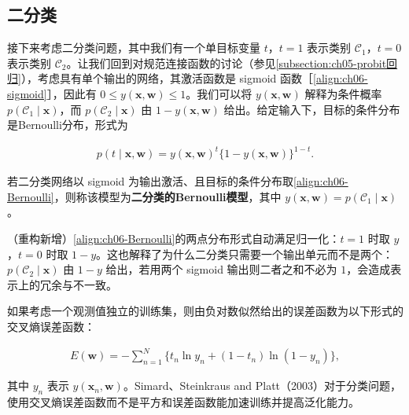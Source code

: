 \documentclass[../../main.tex]{subfiles}
\begin{document}
\subsection{二分类}\label{subsection:ch06-二分类}

接下来考虑二分类问题，其中我们有一个单目标变量 $t$，$t=1$ 表示类别 $\mathcal{C}_1$，$t=0$ 表示类别 $\mathcal{C}_2$。让我们回到对规范连接函数的讨论（参见\cref{subsection:ch05-probit回归}），考虑具有单个输出的网络，其激活函数是 sigmoid 函数［\eqref{align:ch06-sigmoid}］，因此有 $0\leqslant y(\boldsymbol{x},\boldsymbol{w})\leqslant1$。我们可以将 $y(\boldsymbol{x},\boldsymbol{w})$ 解释为条件概率 $p(\mathcal{C}_1\mid\boldsymbol{x})$，而 $p(\mathcal{C}_2\mid\boldsymbol{x})$ 由 $1-y(\boldsymbol{x},\boldsymbol{w})$ 给出。给定输入下，目标的条件分布是Bernoulli分布，形式为

\begin{align}
p(t\mid\boldsymbol{x},\boldsymbol{w})=y(\boldsymbol{x},\boldsymbol{w})^{t}\bigl\{1-y(\boldsymbol{x},\boldsymbol{w})\bigr\}^{1-t}.
\label{align:ch06-Bernoulli}
\end{align}

\begin{definition}[二分类的Bernoulli模型]\label{definition:ch06-二分类Bernoulli}
若二分类网络以 sigmoid 为输出激活、且目标的条件分布取\eqref{align:ch06-Bernoulli}，则称该模型为\textbf{二分类的Bernoulli模型}，其中 $y(\boldsymbol{x},\boldsymbol{w})=p(\mathcal{C}_1\mid\boldsymbol{x})$。
\end{definition}

\begin{remark}（重构新增）\eqref{align:ch06-Bernoulli}的两点分布形式自动满足归一化：$t=1$ 时取 $y$，$t=0$ 时取 $1-y$。这也解释了为什么二分类只需要一个输出单元而不是两个：$p(\mathcal{C}_2\mid\boldsymbol{x})$ 由 $1-y$ 给出，若用两个 sigmoid 输出则二者之和不必为 $1$，会造成表示上的冗余与不一致。
\end{remark}

如果考虑一个观测值独立的训练集，则由负对数似然给出的误差函数为以下形式的交叉熵误差函数：

\begin{align}
E(\boldsymbol{w})=-\sum_{n=1}^{N}\bigl\{t_n\ln y_n+(1-t_n)\ln(1-y_n)\bigr\},
\label{align:ch06-二分类交叉熵}
\end{align}

其中 $y_n$ 表示 $y(\boldsymbol{x}_n,\boldsymbol{w})$。Simard、Steinkraus and Platt（2003）对于分类问题，使用交叉熵误差函数而不是平方和误差函数能加速训练并提高泛化能力。
\end{document}
